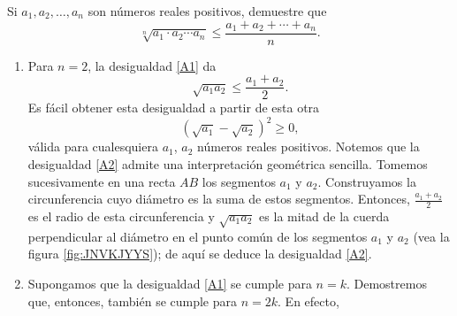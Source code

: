 \begin{example}
    Si $a_1, a_2, \dots, a_n$ son números reales positivos, demuestre que
    \begin{equation}
        \sqrt[n]{a_1\cdot a_2 \cdots a_n} \leq \frac{a_1+a_2+\cdots +a_n}{n}. \label{A1}
    \end{equation}
    \demostracion {}
    \begin{enumerate}[label=\roman*.]
        \item Para $n = 2$, la desigualdad \eqref{A1} da
        \begin{equation}
            \sqrt{a_1a_2} \leq \frac{a_1+a_2}{2}. \label{A2}
        \end{equation}
        Es fácil obtener esta desigualdad a partir de esta otra
        $$\left( \sqrt{a_1} - \sqrt{a_2} \right)^2 \geq 0,$$
        válida para cualesquiera $a_1$, $a_2$ números reales positivos. Notemos que la desigualdad \eqref{A2} admite una interpretación geométrica sencilla. Tomemos sucesivamente en una recta $AB$ los segmentos $a_1$ y $a_2$. Construyamos la circunferencia cuyo diámetro es la suma de estos segmentos. Entonces, $\displaystyle \frac{a_1+a_2}{2}$ es el radio de esta circunferencia y $\sqrt{a_1a_2}$ es la mitad de la cuerda perpendicular al diámetro en el punto común de los segmentos $a_1$ y $a_2$ (vea la figura \ref{fig:JNVKJYYS}); de aquí se deduce la desigualdad \eqref{A2}.
        \item Supongamos que la desigualdad \eqref{A1} se cumple para $n = k$. Demostremos que, entonces, también se cumple para $n = 2k$. En efecto,

\end{enumerate}
\end{example}
